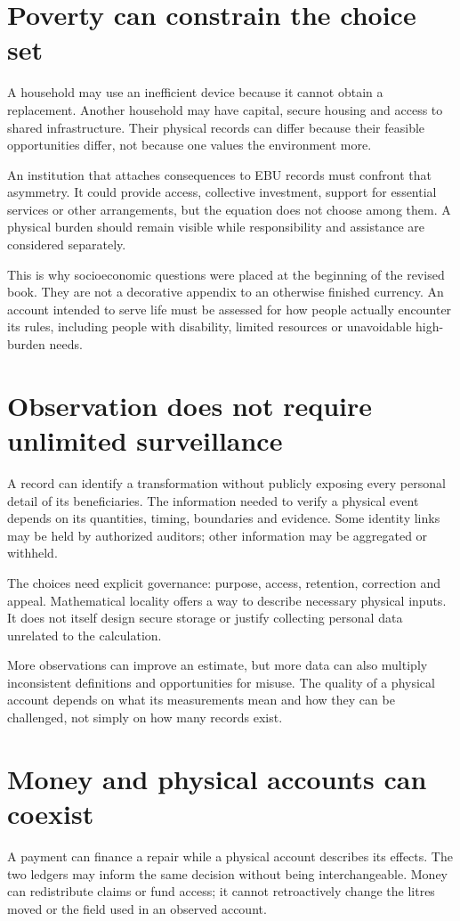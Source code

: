 \section{Poverty can constrain the choice set}
A household may use an inefficient device because it cannot obtain a replacement. Another household may have capital, secure housing and access to shared infrastructure. Their physical records can differ because their feasible opportunities differ, not because one values the environment more.

An institution that attaches consequences to EBU records must confront that asymmetry. It could provide access, collective investment, support for essential services or other arrangements, but the equation does not choose among them. A physical burden should remain visible while responsibility and assistance are considered separately.

This is why socioeconomic questions were placed at the beginning of the revised book. They are not a decorative appendix to an otherwise finished currency. An account intended to serve life must be assessed for how people actually encounter its rules, including people with disability, limited resources or unavoidable high-burden needs.

\section{Observation does not require unlimited surveillance}
A record can identify a transformation without publicly exposing every personal detail of its beneficiaries. The information needed to verify a physical event depends on its quantities, timing, boundaries and evidence. Some identity links may be held by authorized auditors; other information may be aggregated or withheld.

The choices need explicit governance: purpose, access, retention, correction and appeal. Mathematical locality offers a way to describe necessary physical inputs. It does not itself design secure storage or justify collecting personal data unrelated to the calculation.

More observations can improve an estimate, but more data can also multiply inconsistent definitions and opportunities for misuse. The quality of a physical account depends on what its measurements mean and how they can be challenged, not simply on how many records exist.

\section{Money and physical accounts can coexist}
A payment can finance a repair while a physical account describes its effects. The two ledgers may inform the same decision without being interchangeable. Money can redistribute claims or fund access; it cannot retroactively change the litres moved or the field used in an observed account.

